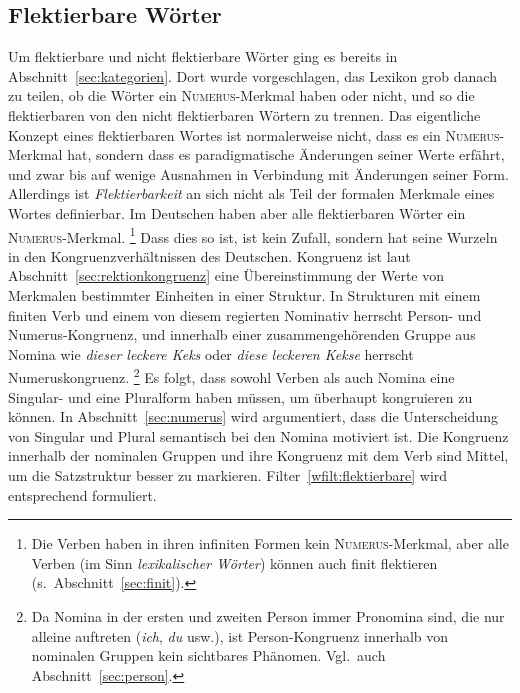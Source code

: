 
\subsection{Flektierbare Wörter}

\label{sec:flektierbarewoerterwortklassen}


Um flektierbare und nicht flektierbare Wörter ging es bereits in Abschnitt~\ref{sec:kategorien}.
Dort wurde vorgeschlagen, das Lexikon grob danach zu teilen, ob die Wörter ein \textsc{Numerus}-Merkmal haben oder nicht, und so die flektierbaren von den nicht flektierbaren Wörtern zu trennen.
Das eigentliche Konzept eines flektierbaren Wortes ist normalerweise nicht, dass es ein \textsc{Numerus}-Merkmal hat, sondern dass es paradigmatische Änderungen seiner Werte erfährt, und zwar bis auf wenige Ausnahmen in Verbindung mit Änderungen seiner Form.
Allerdings ist \textit{Flektierbarkeit} an sich nicht als Teil der formalen Merkmale eines Wortes definierbar.
Im Deutschen haben aber alle flektierbaren Wörter ein \textsc{Numerus}-Merkmal.%
\footnote{Die Verben haben in ihren infiniten Formen kein \textsc{Numerus}-Merkmal, aber alle Verben (im Sinn \textit{lexikalischer Wörter}) können auch finit flektieren (s.\ Abschnitt~\ref{sec:finit}).}
Dass dies so ist, ist kein Zufall, sondern hat seine Wurzeln in den Kongruenzverhältnissen des Deutschen.
Kongruenz ist laut Abschnitt~\ref{sec:rektionkongruenz} eine Übereinstimmung der Werte von Merkmalen bestimmter Einheiten in einer Struktur.
In Strukturen mit einem finiten Verb und einem von diesem regierten Nominativ herrscht Person- und Numerus-Kongruenz, und innerhalb einer zusammengehörenden Gruppe aus Nomina wie \textit{dieser leckere Keks} oder \textit{diese leckeren Kekse} herrscht Numeruskongruenz.%
\footnote{Da Nomina in der ersten und zweiten Person immer Pronomina sind, die nur alleine auftreten (\textit{ich}, \textit{du} usw.), ist Person-Kongruenz innerhalb von nominalen Gruppen kein sichtbares Phänomen.
Vgl.\ auch Abschnitt~\ref{sec:person}.}
Es folgt, dass sowohl Verben als auch Nomina eine Singular- und eine Pluralform haben müssen, um überhaupt kongruieren zu können.
In Abschnitt~\ref{sec:numerus} wird argumentiert, dass die Unterscheidung von Singular und Plural semantisch bei den Nomina motiviert ist.
Die Kongruenz innerhalb der nominalen Gruppen und ihre Kongruenz mit dem Verb sind Mittel, um die Satzstruktur besser zu markieren.
Filter~\ref{wfilt:flektierbare} wird entsprechend formuliert.

